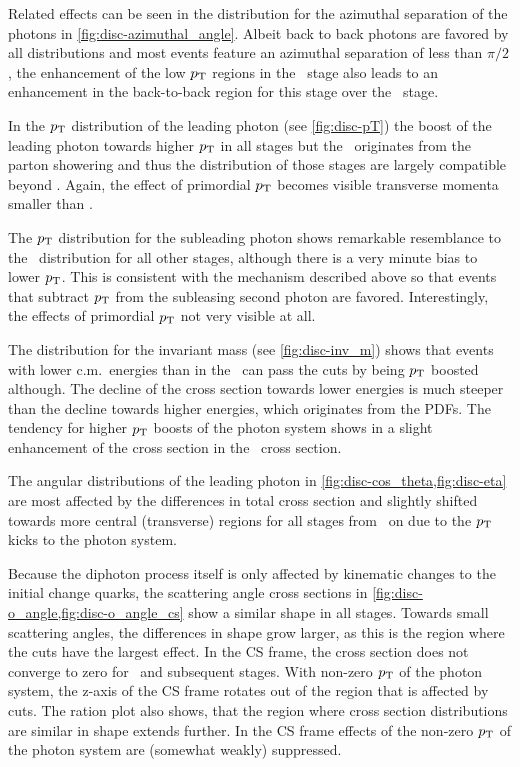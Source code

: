 Related effects can be seen in the distribution for the azimuthal
separation of the photons in \cref{fig:disc-azimuthal_angle}. Albeit
back to back photons are favored by all distributions and most events
feature an azimuthal separation of less than \(\pi/2\), the
enhancement of the low \(p_\mathrm{T}\) regions in the \stthree\ stage also
leads to an enhancement in the back-to-back region for this stage over
the \stone\ stage.

In the \(p_\mathrm{T}\) distribution of the leading photon (see
\cref{fig:disc-pT}) the boost of the leading photon towards higher
\(p_\mathrm{T}\) in all stages but the \stone\ originates from the parton
showering and thus the distribution of those stages are largely
compatible beyond . Again, the effect of primordial \(p_\mathrm{T}\)
becomes visible transverse momenta smaller than .

The \(p_\mathrm{T}\) distribution for the subleading photon shows remarkable
resemblance to the \stone\ distribution for all other stages, although
there is a very minute bias to lower \(p_\mathrm{T}\). This is consistent with
the mechanism described above so that events that subtract \(p_\mathrm{T}\)
from the subleasing second photon are favored. Interestingly, the
effects of primordial \(p_\mathrm{T}\) not very visible at all.

The distribution for the invariant mass (see \cref{fig:disc-inv_m})
shows that events with lower c.m.\ energies than in the \stone\ can
pass the cuts by being \(p_\mathrm{T}\) boosted although. The decline of the
cross section towards lower energies is much steeper than the decline
towards higher energies, which originates from the PDFs. The tendency
for higher \(p_\mathrm{T}\) boosts of the photon system shows in a slight
enhancement of the \sttwo cross section in the \sttwo\ cross section.

The angular distributions of the leading photon in
\cref{fig:disc-cos_theta,fig:disc-eta} are most affected by the
differences in total cross section and slightly shifted towards more
central (transverse) regions for all stages from \sttwo\ on due to the
\(p_\mathrm{T}\) kicks to the photon system.

Because the diphoton process itself is only affected by kinematic
changes to the initial change quarks, the scattering angle cross
sections in \cref{fig:disc-o_angle,fig:disc-o_angle_cs} show a similar
shape in all stages. Towards small scattering angles, the differences
in shape grow larger, as this is the region where the cuts have the
largest effect. In the CS frame, the cross section does not converge
to zero for \sttwo\ and subsequent stages. With non-zero \(p_\mathrm{T}\) of
the photon system, the z-axis of the CS frame rotates out of the
region that is affected by cuts. The ration plot also shows, that the
region where cross section distributions are similar in shape extends
further. In the CS frame effects of the non-zero \(p_\mathrm{T}\) of the photon
system are (somewhat weakly) suppressed.

